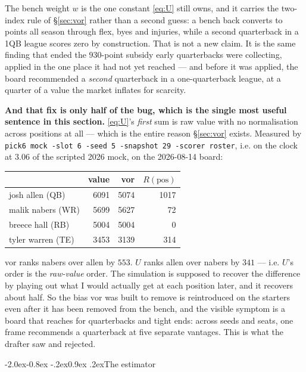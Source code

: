 \documentclass[10pt,a4paper]{article}
\makeatletter
\theoremstyle{plain}
\theoremstyle{definition}
\theoremstyle{remark}
\newcommand{\code}[1]{\texttt{\small #1}}
\renewcommand\subsection{\@startsection{subsection}{2}{\z@}%
  {-2.0ex\@plus -0.8ex \@minus -.2ex}{0.9ex \@plus .2ex}{\normalfont\large\bfseries}}
\makeatother
\begin{document}
The bench weight $w$ is the one constant \eqref{eq:U} still owns, and it carries the
two-index rule of \S\ref{sec:vor} rather than a second guess: a bench back converts to
points all season through flex, byes and injuries, while a second quarterback in a 1QB
league scores zero by construction. That is not a new claim. It is the same finding that
ended the $930$-point subsidy early quarterbacks were collecting, applied in the one place
it had not yet reached --- and before it was applied, the board recommended a \emph{second}
quarterback in a one-quarterback league, at a quarter of a value the market inflates for
scarcity.

\textbf{And that fix is only half of the bug, which is the single most useful sentence in
this section.} \eqref{eq:U}'s \emph{first} sum is raw value with no normalisation across
positions at all --- which is the entire reason \S\ref{sec:vor} exists. Measured by
\code{pick6 mock -slot 6 -seed 5 -snapshot 29 -scorer roster}, i.e. on the clock at 3.06 of
the scripted 2026 mock, on the 2026-08-14 board:

\begin{center}
\begin{tabular}{@{}lrrr@{}}
\toprule
& value & vor & $R(\mathrm{pos})$ \\
\midrule
josh allen (QB)   & 6091 & 5074 & 1017 \\
malik nabers (WR) & 5699 & 5627 & 72 \\
breece hall (RB)  & 5004 & 5004 & 0 \\
tyler warren (TE) & 3453 & 3139 & 314 \\
\bottomrule
\end{tabular}
\end{center}

vor ranks nabers over allen by $553$. $U$ ranks allen over nabers by $341$ --- i.e. $U$'s
order is the \emph{raw-value} order. The simulation is supposed to recover the difference
by playing out what I would actually get at each position later, and it recovers about
half. So the bias vor was built to remove is reintroduced on the starters even after it has
been removed from the bench, and the visible symptom is a board that reaches for
quarterbacks and tight ends: across seeds and seats, one frame recommends a quarterback at
five separate vantages. This is what the drafter saw and rejected.

\subsection{The estimator}
\end{document}
